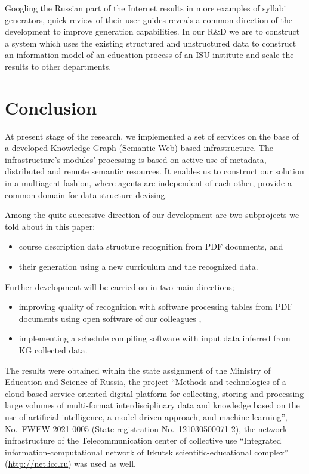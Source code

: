 \documentclass[
]{aiitart}
\begin{document}
Googling the Russian part of the Internet results in more examples of syllabi generators, quick review of their user guides reveals a common direction of the development to improve generation capabilities.  In our R\&D we are to construct a system which uses the existing structured and unstructured data to construct an information model of an education process of an ISU institute and scale the results to other departments.

\section*{Conclusion}

At present stage of the research, we implemented a set of services on the base of a developed Knowledge Graph (Semantic Web) based infrastructure.  The infrastructure's modules' processing is based on active use of metadata, distributed and remote semantic resources.  It enables us to construct our solution in a multiagent fashion, where agents are independent of each other, provide a common domain for data structure devising.

Among the quite successive direction of our development are two subprojects we told about in this paper:
\begin{itemize}
    \item course description data structure recognition from PDF documents, and
    \item their generation using a new curriculum and the recognized data.
\end{itemize}
Further development will be carried on in two main directions;
\begin{itemize}
    \item improving quality of recognition with software processing tables from PDF documents using open software of our colleagues \cite{Shigarov_2016,Shigarov_2017},
    \item implementing a schedule compiling software with input data inferred from KG collected data.
\end{itemize}


\begin{acknowledgments}
The results were obtained within the state assignment of the Ministry of Education and Science of Russia, the project ``Methods and technologies of a cloud-based service-oriented digital platform for collecting, storing and processing large volumes of multi-format interdisciplinary data and knowledge based on the use of artificial intelligence, a model-driven approach, and machine learning'', No.~FWEW-2021-0005 (State registration No.~121030500071-2), the network infrastructure of the Telecommunication center of collective use ``Integrated information-computational network of Irkutsk scientific-educational complex'' (\url{http://net.icc.ru}) was used as well.
\end{acknowledgments}
\end{document}
